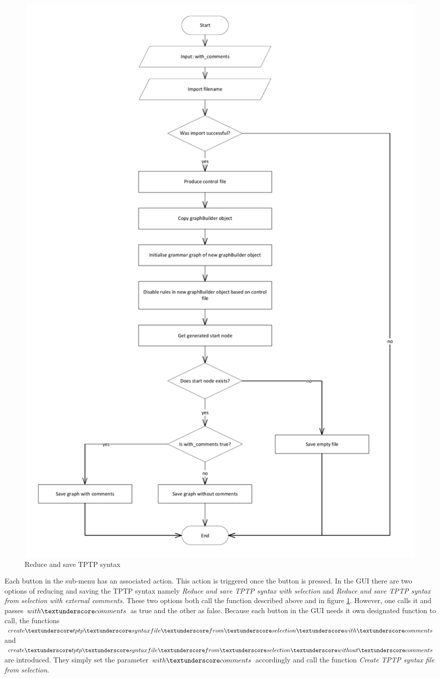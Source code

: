 \begin{figure}[H]
\includegraphics[width=1.05\textwidth]{images/implementation_reduce_and_save_tptp_syntax.pdf}
\caption{Reduce and save \ac{TPTP} syntax}
\label{fig:ImplementationGUIReduceandSave}
\end{figure}

Each button in the sub-menu has an associated action.
This action is triggered once the button is pressed. In the GUI there are two options of reducing and saving the \ac{TPTP} syntax namely \textit{Reduce and save \ac{TPTP} syntax with selection} and \textit{Reduce and save \ac{TPTP} syntax from selection with external comments}.
These two options both call the function described above and in figure \ref{fig:ImplementationGUIReduceandSave}. However, one calls it and passes $with\textunderscore comments$ as true and the other as false.
Because each button in the GUI needs it own designated function to call, the functions $create\textunderscore tptp\textunderscore syntax file\textunderscore from\textunderscore selection\textunderscore with\textunderscore comments$ and $create\textunderscore tptp\textunderscore syntax file\textunderscore from\textunderscore selection\textunderscore without\textunderscore comments$ are introduced.
They simply set the parameter $with\textunderscore comments$ accordingly and call the function \textit{Create \ac{TPTP} syntax file from selection}.

